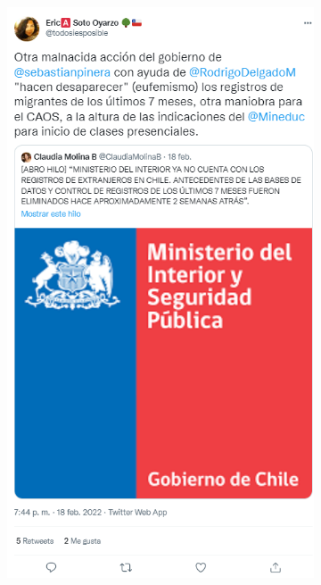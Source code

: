 \begin{figure}[H]
\begin{subfigure}{0.49\textwidth}
                \includegraphics[width=.99\linewidth]{figs/tweet_left_3.png}
            \end{subfigure}%
            \begin{subfigure}{0.49\textwidth}
                \centering

\end{subfigure}
\end{figure}
